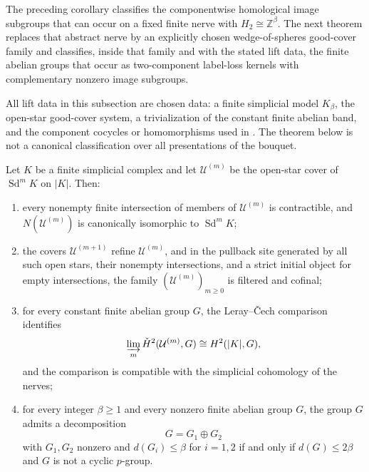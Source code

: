 The preceding corollary classifies the componentwise homological image subgroups that can occur on a fixed finite nerve with $H_2\cong \mathbb Z^\beta$. The next theorem replaces that abstract nerve by an explicitly chosen wedge-of-spheres good-cover family and classifies, inside that family and with the stated lift data, the finite abelian groups that occur as two-component label-loss kernels with complementary nonzero image subgroups.

All lift data in this subsection are chosen data: a finite simplicial
model $K_\beta$, the open-star good-cover system, a trivialization of the
constant finite abelian band, and the component cocycles or homomorphisms used in
. The theorem below is not a canonical
classification over all presentations of the bouquet.

\begin{lemma}\label{lem:bouquet-cover-classical-interface}
Let $K$ be a finite simplicial complex and let $\mathcal U^{(m)}$ be the open-star cover of $\operatorname{Sd}^m K$ on $|K|$. Then:
\begin{enumerate}[label=(\roman*),nosep]
\item every nonempty finite intersection of members of $\mathcal U^{(m)}$ is contractible, and $N(\mathcal U^{(m)})$ is canonically isomorphic to $\operatorname{Sd}^mK$;
\item the covers $\mathcal U^{(m+1)}$ refine $\mathcal U^{(m)}$, and in the pullback site generated by all such open stars, their nonempty intersections, and a strict initial object for empty intersections, the family $(\mathcal U^{(m)})_{m\ge0}$ is filtered and cofinal;
\item for every constant finite abelian group $G$, the Leray--\v{C}ech comparison identifies
\[
\varinjlim_m\check H^2(\mathcal U^{(m)},G)
\cong
H^2(|K|,G),
\]
and the comparison is compatible with the simplicial cohomology of the nerves;
\item for every integer $\beta\ge 1$ and every nonzero finite abelian group $G$, the
group $G$ admits a decomposition
\[
G=G_1\oplus G_2
\]
with $G_1,G_2$ nonzero and $d(G_i)\le\beta$ for $i=1,2$ if and only if $d(G)\le 2\beta$ and $G$ is not a cyclic $p$-group.
\end{enumerate}
\end{lemma}


